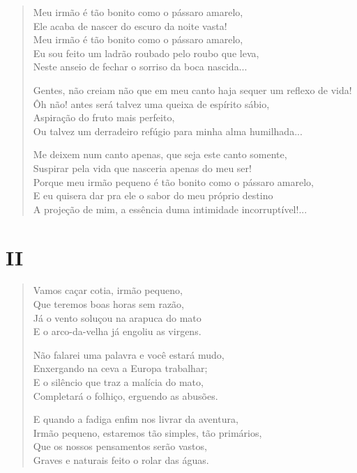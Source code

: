 \begin{verse}
Meu irmão é tão bonito como o pássaro amarelo,\\
Ele acaba de nascer do escuro da noite vasta!\\
Meu irmão é tão bonito como o pássaro amarelo,\\
Eu sou feito um ladrão roubado pelo roubo que leva,\\
Neste anseio de fechar o sorriso da boca nascida...

Gentes, não creiam não que em meu canto haja sequer um reflexo de vida!\\
Ôh não! antes será talvez uma queixa de espírito sábio,\\
Aspiração do fruto mais perfeito,\\
Ou talvez um derradeiro refúgio para minha alma humilhada...

Me deixem num canto apenas, que seja este canto somente,\\
Suspirar pela vida que nasceria apenas do meu ser!\\
Porque meu irmão pequeno é tão bonito como o pássaro amarelo,\\
E eu quisera dar pra ele o sabor do meu próprio destino\\
A projeção de mim, a essência duma intimidade incorruptível!...
\end{verse}

\medskip
\section{II}

\begin{verse}
Vamos caçar cotia, irmão pequeno,\\
Que teremos boas horas sem razão,\\
Já o vento soluçou na arapuca do mato\\
E o arco-da-velha já engoliu as virgens.

Não falarei uma palavra e você estará mudo,\\
Enxergando na ceva a Europa trabalhar;\\
E o silêncio que traz a malícia do mato,\\
Completará o folhiço, erguendo as abusões.

E quando a fadiga enfim nos livrar da aventura,\\
Irmão pequeno, estaremos tão simples, tão primários,\\
Que os nossos pensamentos serão vastos,\\
Graves e naturais feito o rolar das águas.
\end{verse}

